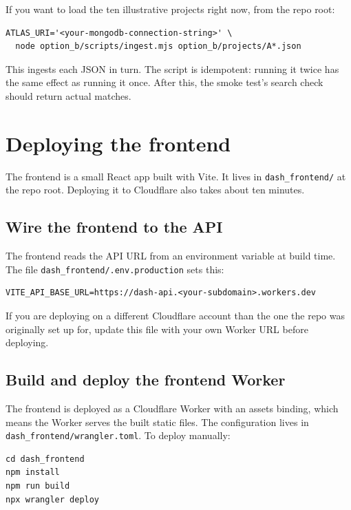 \documentclass[11pt,a4paper]{article}
\begin{document}
If you want to load the ten illustrative projects right now, from the repo root:

\begin{lstlisting}[style=shell]
ATLAS_URI='<your-mongodb-connection-string>' \
  node option_b/scripts/ingest.mjs option_b/projects/A*.json
\end{lstlisting}

This ingests each JSON in turn. The script is idempotent: running it twice has the same effect as running it once. After this, the smoke test's search check should return actual matches.

\section{Deploying the frontend}

The frontend is a small React app built with Vite. It lives in \texttt{dash\_frontend/} at the repo root. Deploying it to Cloudflare also takes about ten minutes.

\subsection{Wire the frontend to the API}

The frontend reads the API URL from an environment variable at build time. The file \texttt{dash\_frontend/.env.production} sets this:

\begin{lstlisting}[style=code]
VITE_API_BASE_URL=https://dash-api.<your-subdomain>.workers.dev
\end{lstlisting}

If you are deploying on a different Cloudflare account than the one the repo was originally set up for, update this file with your own Worker URL before deploying.

\subsection{Build and deploy the frontend Worker}

The frontend is deployed as a Cloudflare Worker with an assets binding, which means the Worker serves the built static files. The configuration lives in \texttt{dash\_frontend/wrangler.toml}. To deploy manually:

\begin{lstlisting}[style=shell]
cd dash_frontend
npm install
npm run build
npx wrangler deploy
\end{lstlisting}
\end{document}
